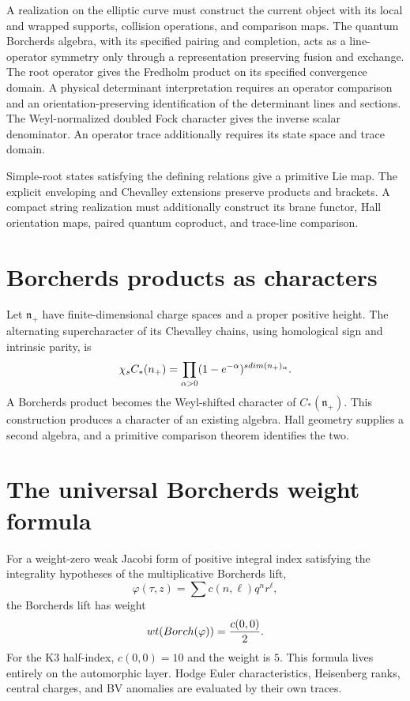 A realization on the elliptic curve must construct the current object
with its local and wrapped supports, collision operations, and comparison maps.
The quantum Borcherds algebra, with its specified pairing and completion,
acts as a line-operator symmetry only through a representation preserving
fusion and exchange. The root operator gives the Fredholm product on its
specified convergence domain. A physical determinant interpretation requires
an operator comparison and an orientation-preserving identification of the
determinant lines and sections. The Weyl-normalized doubled Fock character gives the inverse scalar denominator.
An operator trace additionally requires its state space and trace domain.

Simple-root states satisfying the defining relations give a primitive Lie map.
The explicit enveloping and Chevalley extensions preserve products and brackets.
A compact string realization must additionally construct its brane functor,
Hall orientation maps, paired quantum coproduct, and trace-line comparison.

\section{Borcherds products as characters}
Let $\mathfrak n_+$ have finite-dimensional charge spaces and a
proper positive height. The alternating supercharacter of its Chevalley
chains, using homological sign and intrinsic parity, is
\[
 \chi_{s}C_*(n_+)
 =\prod_{\alpha>0}(1-e^{-\alpha})^{sdim(n_+)_\alpha}.
\]
A Borcherds product becomes the Weyl-shifted character of $C_*(\mathfrak n_+)$. This construction produces a character of an existing algebra. Hall geometry supplies a second algebra, and a primitive comparison theorem identifies the two.

\section{The universal Borcherds weight formula}
For a weight-zero weak Jacobi form of positive integral index satisfying the integrality hypotheses of the multiplicative Borcherds lift,
\[
 \varphi(\tau,z)=\sum c(n,\ell)q^nr^\ell,
\]
the Borcherds lift has weight
\[
 wt(Borch(\varphi))=\frac{c(0,0)}2.
\]
For the K3 half-index, $c(0,0)=10$ and the weight is $5$. This formula lives entirely on the automorphic layer. Hodge Euler characteristics, Heisenberg ranks, central charges, and BV anomalies are evaluated by their own traces.

